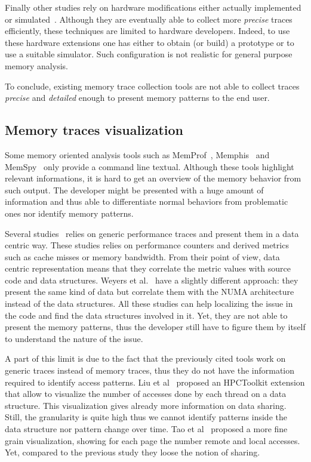 Finally other studies rely on hardware modifications either actually implemented or simulated~\cite{Bao08HMTT,Martonosi92MemSpy}.
Although they are eventually able to collect more \emph{precise} traces efficiently, these techniques are limited to hardware developers.
Indeed, to use these hardware extensions one has either to obtain (or build) a prototype or to use a suitable simulator.
Such configuration is not realistic for general purpose memory analysis.

To conclude, existing memory trace collection tools are not able to collect traces \emph{precise} and \emph{detailed} enough to present memory patterns to the end user.

\subsection{Memory traces visualization}

Some memory oriented analysis tools such as \gls{MemProf}~\cite{Lachaize12MemProf}, \gls{Memphis}~\cite{McCurdy10Memphis} and \gls{MemSpy}~\cite{Martonosi92MemSpy} only provide a command line textual.
Although these tools highlight relevant informations, it is hard to get an overview of the memory behavior from such output.
The developer might be presented with a huge amount of information and thus able to differentiate normal behaviors from problematic ones nor identify memory patterns.

Several studies~\cite{DeRose01Hardware,DeRose02SIGMA,Bosch00Rivet} relies on generic performance traces and present them in a data centric way.
These studies relies on performance counters and derived metrics such as cache misses or memory bandwidth.
From their point of view, data centric representation means that they correlate the metric values with source code and data structures.
Weyers et al.~\cite{Weyers14Visualization} have a slightly different approach: they present the same kind of data but correlate them with the \gls{NUMA} architecture instead of the data structures.
All these studies can help localizing the issue in the code and find the data structures involved in it.
Yet, they are not able to present the memory patterns, thus the developer still have to figure them by itself to understand the nature of the issue.

A part of this limit is due to the fact that the previously cited tools work on generic traces instead of memory traces, thus they do not have the information required to identify access patterns.
Liu et al~\cite{Liu13Datacentric,Liu14Tool} proposed an \gls{HPCToolkit} extension that allow to visualize the number of accesses done by each thread on a data structure.
This visualization gives already more information on data sharing.
Still, the granularity is quite high thus we cannot identify patterns inside the data structure nor pattern change over time.
Tao et al~\cite{Tao01Visualizing} proposed a more fine grain  visualization, showing for each page the number remote and local accesses.
Yet, compared to the previous study they loose the notion of sharing.

